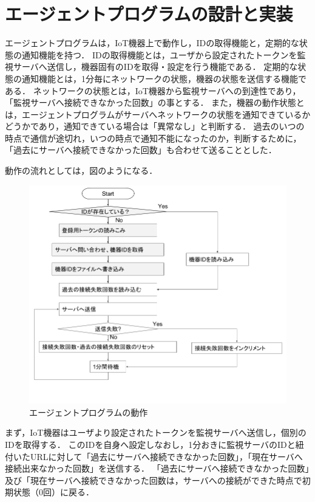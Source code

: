 \section{エージェントプログラムの設計と実装}
エージェントプログラムは，IoT機器上で動作し，IDの取得機能と，定期的な状態の通知機能を持つ．
IDの取得機能とは，ユーザから設定されたトークンを監視サーバへ送信し，機器固有のIDを取得・設定を行う機能である．
定期的な状態の通知機能とは，1分毎にネットワークの状態，機器の状態を送信する機能である．
ネットワークの状態とは，IoT機器から監視サーバへの到達性であり，「監視サーバへ接続できなかった回数」の事とする．
また，機器の動作状態とは，エージェントプログラムがサーバへネットワークの状態を通知できているかどうかであり，通知できている場合は「異常なし」と判断する．
過去のいつの時点で通信が途切れ，いつの時点で通知不能になったのか，判断するために，「過去にサーバへ接続できなかった回数」も合わせて送ることとした．

動作の流れとしては，図のようになる．
\begin{figure}[htbp]
\begin{center}
\includegraphics[width=16cm]{images/agent_flow.png}
\caption{エージェントプログラムの動作}
\label{fig:agent_flow}
\end{center}
\end{figure}
まず，IoT機器はユーザより設定されたトークンを監視サーバへ送信し，個別のIDを取得する．
このIDを自身へ設定しなおし，1分おきに監視サーバのIDと紐付いたURLに対して「過去にサーバへ接続できなかった回数」，「現在サーバへ接続出来なかった回数」を送信する．
「過去にサーバへ接続できなかった回数」及び「現在サーバへ接続できなかった回数は，サーバへの接続ができた時点で初期状態（0回）に戻る．


